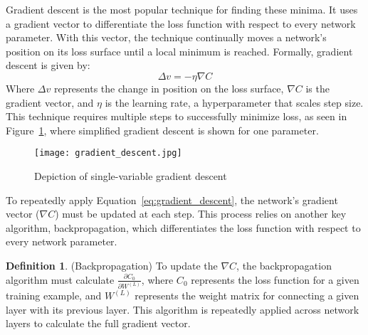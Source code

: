 \documentclass{article}
\theoremstyle{definition}
\newtheorem{definition}{Definition}[section]
\begin{document}
Gradient descent is the most popular technique for finding these minima. It uses a gradient vector to differentiate the loss function with respect to every network parameter. With this vector, the technique continually moves a network's position on its loss surface until a local minimum is reached. Formally, gradient descent is given by:
\begin{equation}
\label{eq:gradient_descent}
    \Delta v = - \eta \nabla C
\end{equation}
Where $\Delta v$ represents the change in position on the loss surface, $\nabla C$ is the gradient vector, and $\eta$ is the learning rate, a hyperparameter that scales step size. This technique requires multiple steps to successfully minimize loss, as seen in Figure~\ref{fig:Figure 2}, where simplified gradient descent is shown for one parameter.
\begin{figure}[H]
    \centering
    \texttt{[image: gradient\_descent.jpg]}
    \caption{Depiction of single-variable gradient descent \cite{gradesc}}
    \label{fig:Figure 2}
\end{figure}
To repeatedly apply Equation~\eqref{eq:gradient_descent}, the network's gradient vector ($\nabla C$) must be updated at each step. This process relies on another key algorithm, backpropagation, which differentiates the loss function with respect to every network parameter.
\begin{definition}(Backpropagation)
To update the $\nabla C$, the backpropagation algorithm must calculate $\frac{\partial C_0}{\partial W^{(L)}}$, where $C_0$ represents the loss function for a given training example, and $W^{(L)}$ represents the weight matrix for connecting a given layer with its previous layer. This algorithm is repeatedly applied across network layers to calculate the full gradient vector. 
\end{definition}
\end{document}
